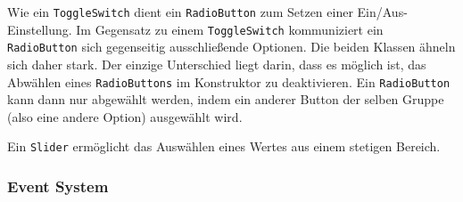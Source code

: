 		\medskip
		\begin{figure}
			\label{uml-radiobutton}
		\end{figure}
		Wie ein \texttt{ToggleSwitch} dient ein \texttt{RadioButton} zum Setzen einer Ein/Aus-Einstellung.
		Im Gegensatz zu einem \texttt{ToggleSwitch} kommuniziert ein \texttt{RadioButton} sich gegenseitig ausschließende Optionen.
		Die beiden Klassen ähneln sich daher stark. Der einzige Unterschied liegt darin, dass es möglich ist, das Abwählen eines
		\texttt{RadioButtons} im Konstruktor zu deaktivieren. Ein \texttt{RadioButton} kann dann nur abgewählt werden,
		indem ein anderer Button der selben Gruppe (also eine andere Option) ausgewählt wird.
		
		\medskip
		\begin{figure}
			\label{uml-slider}
		\end{figure}
		Ein \texttt{Slider} ermöglicht das Auswählen eines Wertes aus einem stetigen Bereich.
		
	\subsubsection{Event System}\label{sec:EventSystem}